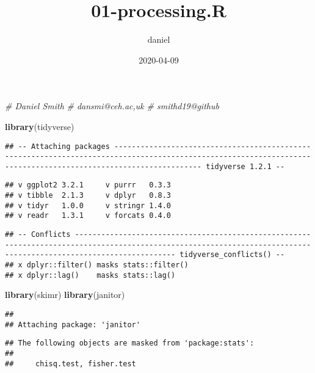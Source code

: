 \documentclass[]{article}
\title{01-processing.R}
\author{daniel}
\date{2020-04-09}
\newenvironment{Shaded}{\begin{snugshade}}{\end{snugshade}}
\newcommand{\CommentTok}[1]{\textcolor[rgb]{0.56,0.35,0.01}{\textit{#1}}}
\newcommand{\KeywordTok}[1]{\textcolor[rgb]{0.13,0.29,0.53}{\textbf{#1}}}
\newcommand{\NormalTok}[1]{#1}
\begin{document}
\maketitle

\begin{Shaded}
\begin{Highlighting}[]
\CommentTok{# Daniel Smith}
\CommentTok{# dansmi@ceh.ac,uk}
\CommentTok{# smithd19@github}
\end{Highlighting}
\end{Shaded}

\begin{Shaded}
\begin{Highlighting}[]
\KeywordTok{library}\NormalTok{(tidyverse)}
\end{Highlighting}
\end{Shaded}

\begin{verbatim}
## -- Attaching packages ---------------------------------------------------------------------------------------------------------------------------------------------------------------- tidyverse 1.2.1 --
\end{verbatim}

\begin{verbatim}
## v ggplot2 3.2.1     v purrr   0.3.3
## v tibble  2.1.3     v dplyr   0.8.3
## v tidyr   1.0.0     v stringr 1.4.0
## v readr   1.3.1     v forcats 0.4.0
\end{verbatim}

\begin{verbatim}
## -- Conflicts ------------------------------------------------------------------------------------------------------------------------------------------------------------------- tidyverse_conflicts() --
## x dplyr::filter() masks stats::filter()
## x dplyr::lag()    masks stats::lag()
\end{verbatim}

\begin{Shaded}
\begin{Highlighting}[]
\KeywordTok{library}\NormalTok{(skimr)}
\KeywordTok{library}\NormalTok{(janitor)}
\end{Highlighting}
\end{Shaded}

\begin{verbatim}
## 
## Attaching package: 'janitor'
\end{verbatim}

\begin{verbatim}
## The following objects are masked from 'package:stats':
## 
##     chisq.test, fisher.test
\end{verbatim}
\end{document}
